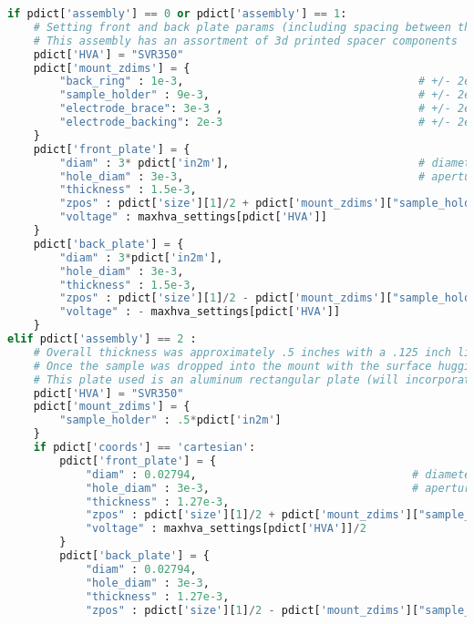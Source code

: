 \begin{lstlisting}[frame=single, language=Python]
if pdict['assembly'] == 0 or pdict['assembly'] == 1:
    # Setting front and back plate params (including spacing between them and voltage on respective plates)
    # This assembly has an assortment of 3d printed spacer components
    pdict['HVA'] = "SVR350"
    pdict['mount_zdims'] = {
        "back_ring" : 1e-3,                                    # +/- 2e-4 [m]
        "sample_holder" : 9e-3,                                # +/- 2e-4 [m]
        "electrode_brace": 3e-3 ,                              # +/- 2e-4 [m]
        "electrode_backing": 2e-3                              # +/- 2e-4 [m]
    }
    pdict['front_plate'] = {
        "diam" : 3* pdict['in2m'],                             # diameter of plate [m]
        "hole_diam" : 3e-3,                                    # aperture diameter [m]
        "thickness" : 1.5e-3,
        "zpos" : pdict['size'][1]/2 + pdict['mount_zdims']["sample_holder"]/2,         # location of plate surface (com) [m]
        "voltage" : maxhva_settings[pdict['HVA']]                       # Voltage on front plate [V]
    }
    pdict['back_plate'] = {
        "diam" : 3*pdict['in2m'], 
        "hole_diam" : 3e-3,
        "thickness" : 1.5e-3, 
        "zpos" : pdict['size'][1]/2 - pdict['mount_zdims']["sample_holder"]/2,
        "voltage" : - maxhva_settings[pdict['HVA']]
    } 
elif pdict['assembly'] == 2 : 
    # Overall thickness was approximately .5 inches with a .125 inch lip on one end and .125 gap on the other end of sample.
    # Once the sample was dropped into the mount with the surface hugging the PVC lip, it was held down with a nylon set screw (with a rubberized tip)
    # This plate used is an aluminum rectangular plate (will incorporate cartesian coordinates into program soon)
    pdict['HVA'] = "SVR350"
    pdict['mount_zdims'] = {
        "sample_holder" : .5*pdict['in2m']
    }
    if pdict['coords'] == 'cartesian':
        pdict['front_plate'] = {
            "diam" : 0.02794,                                 # diameter of plate [m]
            "hole_diam" : 3e-3,                               # aperture diameter [m]
            "thickness" : 1.27e-3, 
            "zpos" : pdict['size'][1]/2 + pdict['mount_zdims']["sample_holder"]/2,    # location of plate surface (com) [m]
            "voltage" : maxhva_settings[pdict['HVA']]/2                               # Voltage on front plate [V] (MAX value for associated HVA)
        }
        pdict['back_plate'] = {
            "diam" : 0.02794,
            "hole_diam" : 3e-3,
            "thickness" : 1.27e-3, 
            "zpos" : pdict['size'][1]/2 - pdict['mount_zdims']["sample_holder"]/2,

\end{lstlisting}
